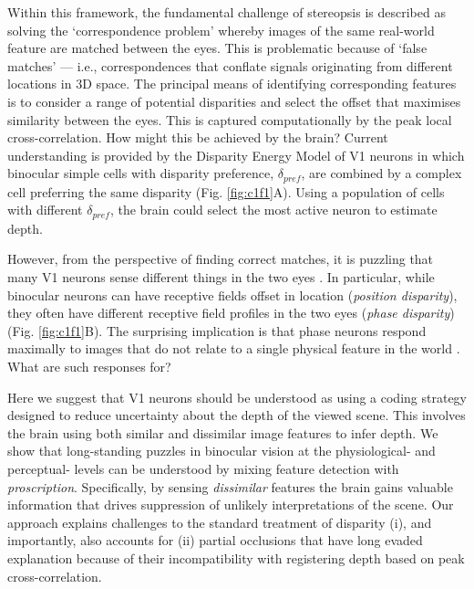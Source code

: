 Within this framework, the fundamental challenge of stereopsis is described as solving the `correspondence problem' \cite{Julesz:1971uq,Marr:1976dq,Scharstein:2002by} whereby images of the same real-world feature are matched between the eyes. This is problematic because of `false matches' --- i.e., correspondences that conflate signals originating from different locations in 3D space. The principal means of identifying corresponding features is to consider a range of potential disparities and select the offset that maximises similarity between the eyes. This is captured computationally by the peak local cross-correlation. How might this be achieved by the brain? Current understanding is provided by the Disparity Energy Model of V1 neurons \cite{Ohzawa:1990cq, Fleet:1996tq, Qian:1997bu} in which binocular simple cells with disparity preference, $\delta_{pref}$, are combined by a complex cell preferring the same disparity (Fig. \ref{fig:c1f1}A). Using a population of cells with different $\delta_{pref}$, the brain could select the most active neuron to estimate depth.

However, from the perspective of finding correct matches, it is puzzling that many V1 neurons sense different things in the two eyes \cite{DeAngelis:1991mb, Prince:2002uq, Tsao:2003pi}. In particular, while binocular neurons can have receptive fields offset in location ({\it position disparity}), they often have different receptive field profiles in the two eyes ({\it phase disparity}) (Fig. \ref{fig:c1f1}B). The surprising implication is that phase neurons respond maximally to images that do not relate to a single physical feature in the world \cite{Read:2007nx}. What are such responses for? 

Here we suggest that V1 neurons should be understood as using a coding strategy designed to reduce uncertainty about the depth of the viewed scene. This involves the brain using both similar and dissimilar image features to infer depth. We show that long-standing puzzles in binocular vision at the physiological- and perceptual- levels can be understood by mixing feature detection with \emph {proscription}. Specifically, by sensing \emph {dissimilar} features the brain gains valuable information that drives suppression of unlikely interpretations of the scene. Our approach explains challenges to the standard treatment of disparity (i), and importantly, also accounts for (ii) partial occlusions that have long evaded explanation because of their incompatibility with registering depth based on peak cross-correlation. 

